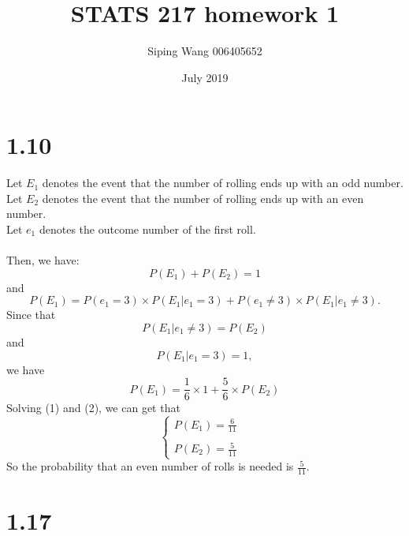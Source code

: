 \documentclass{article}
\title{STATS 217 homework 1}
\author{Siping Wang 006405652}
\date{July 2019}
\begin{document}
\maketitle

\section{1.10}

Let $E_1$ denotes the event that the number of rolling ends up with an odd number. \\
Let $E_2$ denotes the event that the number of rolling ends up with an even number. \\
Let $e_1$ denotes the outcome number of the first roll. \\\\
Then, we have: 
\begin{equation}
    P(E_1) + P(E_2) = 1
\end{equation}
and
\begin{equation*}
    P(E_1) = P(e_1 = 3) \times P(E_1|e_1 = 3) + P(e_1 \not= 3) \times P(E_1|e_1 \not= 3).
\end{equation*}
Since that 
\begin{equation*}
    P(E_1|e_1 \not= 3) = P(E_2)
\end{equation*}
and
\begin{equation*}
    P(E_1|e_1 = 3) = 1,
\end{equation*}
we have
\begin{equation}
    P(E_1) = \frac{1}{6} \times 1 + \frac{5}{6} \times P(E_2)
\end{equation}
Solving (1) and (2), we can get that
\begin{equation*}
    \left\{
    \begin{array}{cc}
         P(E_1) = \frac{6}{11}&  \\
         &   \\
         P(E_2) = \frac{5}{11}&  
    \end{array}
    \right.
\end{equation*}
So the probability that an even number of rolls is needed is $\frac{5}{11}$.

\section{1.17}
\end{document}
